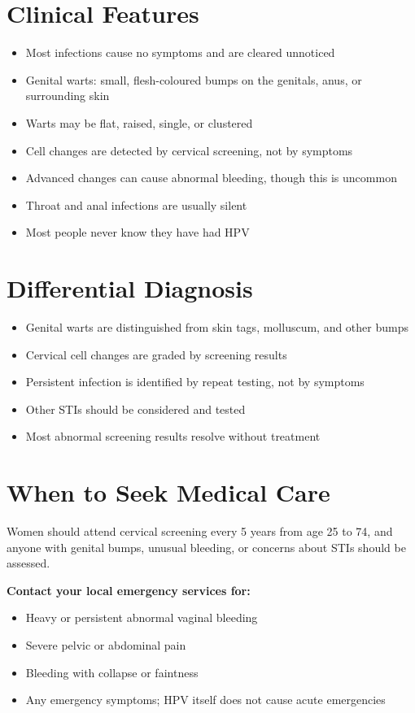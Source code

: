 \section*{Clinical Features}
\begin{itemize}
    \item Most infections cause no symptoms and are cleared unnoticed
    \item Genital warts: small, flesh-coloured bumps on the genitals, anus, or surrounding skin
    \item Warts may be flat, raised, single, or clustered
    \item Cell changes are detected by cervical screening, not by symptoms
    \item Advanced changes can cause abnormal bleeding, though this is uncommon
    \item Throat and anal infections are usually silent
    \item Most people never know they have had HPV
\end{itemize}

\section*{Differential Diagnosis}
\begin{itemize}
    \item Genital warts are distinguished from skin tags, molluscum, and other bumps
    \item Cervical cell changes are graded by screening results
    \item Persistent infection is identified by repeat testing, not by symptoms
    \item Other STIs should be considered and tested
    \item Most abnormal screening results resolve without treatment
\end{itemize}

\section*{When to Seek Medical Care}
Women should attend cervical screening every 5 years from age 25 to 74, and anyone with genital bumps, unusual bleeding, or concerns about STIs should be assessed.

\textbf{Contact your local emergency services for:}
\begin{itemize}
    \item Heavy or persistent abnormal vaginal bleeding
    \item Severe pelvic or abdominal pain
    \item Bleeding with collapse or faintness
    \item Any emergency symptoms; HPV itself does not cause acute emergencies
\end{itemize}


